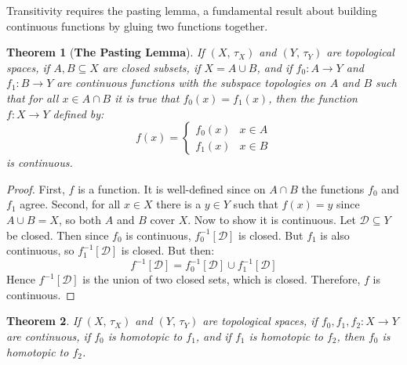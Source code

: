\documentclass{article}
\theoremstyle{plain}
\newtheorem{theorem}{Theorem}[section]
\theoremstyle{normal}
\begin{document}
        Transitivity requires the pasting lemma, a fundamental result about
        building continuous functions by gluing two functions together.
        \begin{theorem}[\textbf{The Pasting Lemma}]
            If $(X,\,\tau_{X})$ and $(Y,\,\tau_{Y})$ are topological spaces,
            if $A,B\subseteq{X}$ are closed subsets, if $X=A\cup{B}$, and if
            $f_{0}:A\rightarrow{Y}$ and $f_{1}:B\rightarrow{Y}$ are continuous
            functions with the subspace topologies on $A$ and $B$ such that
            for all $x\in{A}\cap{B}$ it is true that $f_{0}(x)=f_{1}(x)$, then
            the function $f:X\rightarrow{Y}$ defined by:
            \begin{equation}
                f(x)=
                \begin{cases}
                    f_{0}(x)&x\in{A}\\
                    f_{1}(x)&x\in{B}
                \end{cases}
            \end{equation}
            is continuous.
        \end{theorem}
        \begin{proof}
            First, $f$ is a function. It is well-defined since on
            $A\cap{B}$ the functions $f_{0}$ and $f_{1}$ agree. Second, for
            all $x\in{X}$ there is a $y\in{Y}$ such that $f(x)=y$ since
            $A\cup{B}=X$, so both $A$ and $B$ cover $X$. Now to show it is
            continuous. Let $\mathcal{D}\subseteq{Y}$ be closed. Then since
            $f_{0}$ is continuous, $f_{0}^{-1}[\mathcal{D}]$ is closed. But
            $f_{1}$ is also continuous, so $f_{1}^{-1}[\mathcal{D}]$ is
            closed. But then:
            \begin{equation}
                f^{-1}[\mathcal{D}]
                =f_{0}^{-1}[\mathcal{D}]\cup{f}_{1}^{-1}[\mathcal{D}]
            \end{equation}
            Hence $f^{-1}[\mathcal{D}]$ is the union of two closed sets,
            which is closed. Therefore, $f$ is continuous.
        \end{proof}
        \begin{theorem}
            If $(X,\,\tau_{X})$ and $(Y,\,\tau_{Y})$ are topological spaces,
            if $f_{0},f_{1},f_{2}:X\rightarrow{Y}$ are continuous, if
            $f_{0}$ is homotopic to $f_{1}$, and if $f_{1}$ is homotopic to
            $f_{2}$, then $f_{0}$ is homotopic to $f_{2}$.
        \end{theorem}
\end{document}
